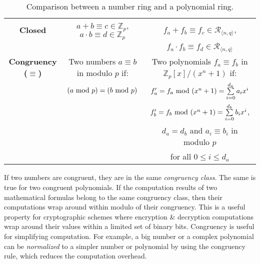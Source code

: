 \begin{table}[h]
\begin{tabular}{|c||c|c|}
\textbf{{Closed}}& $a + b \equiv c \in \mathbb{Z}_p$, $a \cdot b \equiv d \in \mathbb{Z}_p$ & $f_a + f_b \equiv f_c \in \mathcal{R}_{\langle n, q \rangle}$, \\
&&$f_a \cdot f_b \equiv f_d \in \mathcal{R}_{\langle n, q \rangle}$\\
\hline
\textbf{{Congruency ($\equiv$)}} & Two numbers $a \equiv b$ in modulo $p$ if: & Two polynomials $f_a \equiv f_b$ in $\mathbb{Z}_p[x] / (x^n + 1)$ if:    \\
 & $(a \text{ } \text{\text{mod}} \text{ } p) = (b \text{ } \text{\text{mod}} \text{ } p)$   & $f'_a = f_a \text{ } \text{\text{mod}} \text{ } (x^n + 1) = \sum\limits_{i=0}^{d_a} a_ix^i$ \\
 & & $f'_b = f_b \text{ } \text{\text{mod}} \text{ } (x^n + 1) = \sum\limits_{i=0}^{d_b} b_ix^i$, \\
&& $d_a = d_b$ and $a_i \equiv b_i$ in modulo $p$\\
&&for all $0 \leq i \leq d_a$\\ 
\hline
\end{tabular}%
\centering
\caption{Comparison between a number ring and a polynomial ring.
}
\label{tab:ring-comparison}
\end{table}

 If two numbers are congruent, they are in the same \textit{congruency class}. The same is true for two congruent polynomials. If the computation results of two mathematical formulas belong to the same congruency class, then their computations wrap around within modulo of their congruency. This is a useful property for cryptographic schemes where encryption \& decryption computations wrap around their values within a limited set of binary bits. Congruency is useful for simplifying computation. For example, a big number or a complex polynomial can be \textit{normalized} to a simpler number or polynomial by using the congruency rule, which reduces the computation overhead. 

